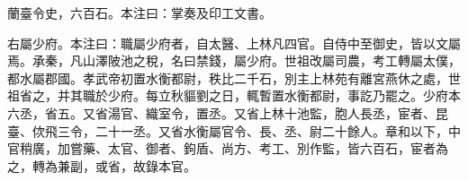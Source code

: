 \begin{pinyinscope}
蘭臺令史，六百石。本注曰：掌奏及印工文書。

右屬少府。本注曰：職屬少府者，自太醫、上林凡四官。自侍中至御史，皆以文屬焉。承秦，凡山澤陂池之稅，名曰禁錢，屬少府。世祖改屬司農，考工轉屬太僕，都水屬郡國。孝武帝初置水衡都尉，秩比二千石，別主上林苑有離宮燕休之處，世祖省之，并其職於少府。每立秋貙劉之日，輒暫置水衡都尉，事訖乃罷之。少府本六丞，省五。又省湯官、織室令，置丞。又省上林十池監，胞人長丞，宦者、昆臺、佽飛三令，二十一丞。又省水衡屬官令、長、丞、尉二十餘人。章和以下，中官稍廣，加嘗藥、太官、御者、鉤盾、尚方、考工、別作監，皆六百石，宦者為之，轉為兼副，或省，故錄本官。


\end{pinyinscope}